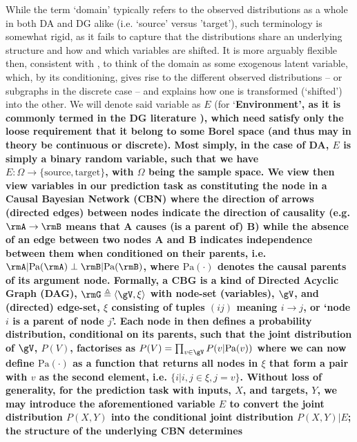While the term `domain' typically refers to the observed distributions as a whole in both DA and DG
alike (i.e. `source' versus 'target'), such terminology is somewhat rigid, as it fails to capture
that the distributions share an underlying structure and how and which variables are shifted.
%
It is more arguably flexible then, consistent with \citep{mooij2020joint}, to think of the domain
as some exogenous latent variable, which, by its conditioning, gives rise to the different observed
distributions -- or subgraphs in the discrete case -- and explains how one is transformed
(`shifted') into the other.
%
We will denote said variable as \(E\) (for `\bf{E}nvironment', as it is commonly termed in the DG
literature \citep{arjovskyinvariant}), which need satisfy only the loose requirement that it belong
to some Borel space (and thus may in theory be continuous or discrete).
%
Most simply, in the case of DA, \(E\) is simply a binary random variable, such that we have \(E:
\Omega \to \{ \text{source}, \text{target} \}\), with \( \Omega \) being the sample space.
%
We view then view variables in our prediction task as constituting the node \gV \) in a Causal
Bayesian Network (CBN) where the direction of arrows (directed edges) between nodes indicate the
direction of causality (e.g. \(\rmA \to \rmB \) means that \bf{A} causes (is a parent of) \bf{B})
while the absence of an edge between two nodes \textbf{A} and \textbf{B} indicates independence
between them when conditioned on their parents, i.e. \( \rmA | \text{Pa}(\rmA) \perp \rmB |
\text{Pa}(\rmB) \), where \( \text{Pa}(\cdot) \) denotes the causal parents of its argument node.
%
Formally, a CBG is a kind of Directed Acyclic Graph (DAG), \(\rmG \triangleq \langle \gV, \xi
\rangle \) with node-set (variables), \(\gV\), and (directed) edge-set, \(\xi\) consisting of tuples
\((ij)\) meaning \(i \to j \), or `node \(i\) is a parent of node \(j\)'.
%
Each node in \rmG then defines a probability distribution, conditional on its parents, such that
the joint distribution of \(\gV\), \(P(V)\), factorises as \( P(V) = \prod_{v \in \gV} P(v |
\text{Pa}(v)) \) where we can now define \(\text{Pa}(\cdot)\) as a function that returns all nodes
in \(\xi\) that form a pair with \(v\) as the second element, i.e. \( \{ i | i,j \in \xi, j = v \}
\).
%
Without loss of generality, for the prediction task with inputs, \(X\), and targets, \(Y\), we may
introduce the aforementioned variable \(E\) to convert the joint distribution \(P(X, Y)\) into the
conditional joint distribution \( P(X, Y) | E \); the structure of the underlying CBN determines
